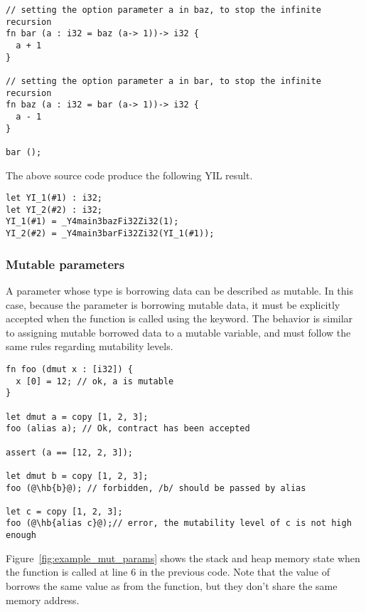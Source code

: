 \begin{lstlisting}[style=coloredverbatim]
// setting the option parameter a in baz, to stop the infinite recursion
fn bar (a : i32 = baz (a-> 1))-> i32 {
  a + 1
}

// setting the option parameter a in bar, to stop the infinite recursion
fn baz (a : i32 = bar (a-> 1))-> i32 {
  a - 1
}

bar ();
\end{lstlisting}

The above source code produce the following YIL result.

\begin{lstlisting}[style=intermediateVerb]
let YI_1(#1) : i32;
let YI_2(#2) : i32;
YI_1(#1) = _Y4main3bazFi32Zi32(1);
YI_2(#2) = _Y4main3barFi32Zi32(YI_1(#1));
\end{lstlisting}


\subsubsection {Mutable parameters}
\label{sec:mutable_parameter}

A parameter whose type is borrowing data can be described as mutable. In this
case, because the parameter is borrowing mutable data, it must be explicitly
accepted when the function is called using the  keyword. The
behavior is similar to assigning mutable borrowed data to a mutable variable,
and must follow the same rules regarding mutability levels.

\begin{lstlisting}[style=coloredverbatim, escapechar=@]
fn foo (dmut x : [i32]) {
  x [0] = 12; // ok, a is mutable
}

let dmut a = copy [1, 2, 3];
foo (alias a); // Ok, contract has been accepted

assert (a == [12, 2, 3]);

let dmut b = copy [1, 2, 3];
foo (@\hb{b}@); // forbidden, /b/ should be passed by alias

let c = copy [1, 2, 3];
foo (@\hb{alias c}@);// error, the mutability level of c is not high enough
\end{lstlisting}

Figure~\ref{fig:example_mut_params} shows the stack and heap memory state when
the  function is called at line 6 in the previous code. Note that
the value of  borrows the same value as  from the
 function, but they don't share the same memory address.

